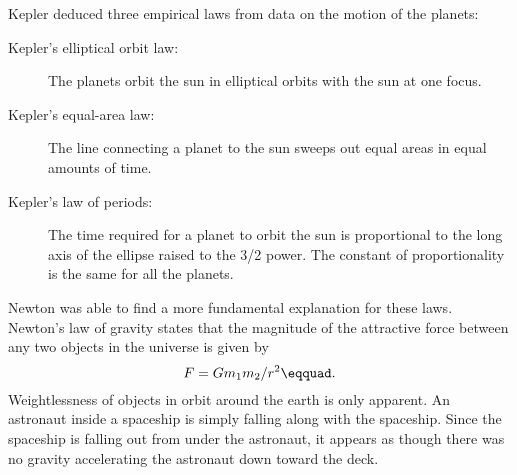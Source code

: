 \begin{summary}

\begin{vocab}






\end{vocab}

\begin{notation}


\end{notation}

\begin{summarytext}

Kepler deduced three empirical laws from data on the
motion of the planets:
\begin{description}
  \item[Kepler's elliptical orbit law:] The planets orbit the sun in
  elliptical orbits with the sun at one focus.
  \item[Kepler's equal-area law:] The line connecting a planet to the
  sun sweeps out equal areas in equal amounts of time.
  \item[Kepler's law of periods:] The time required for a planet to
  orbit the sun is proportional to the long axis of the
  ellipse raised to the 3/2 power. The constant of proportionality
  is the same for all the planets.
\end{description}
Newton was able to find a more fundamental explanation for
these laws. Newton's law of gravity states that the
magnitude of the attractive force between any two objects in
the universe is given by
\begin{equation*}
F=Gm_1m_2/r^2\eqquad.
\end{equation*}
Weightlessness of objects in orbit around the earth is only
apparent. An astronaut inside a spaceship is simply falling
along with the spaceship. Since the spaceship is falling out
from under the astronaut, it appears as though there was no
gravity accelerating the astronaut down toward the deck.


\end{summarytext}
\end{summary}
